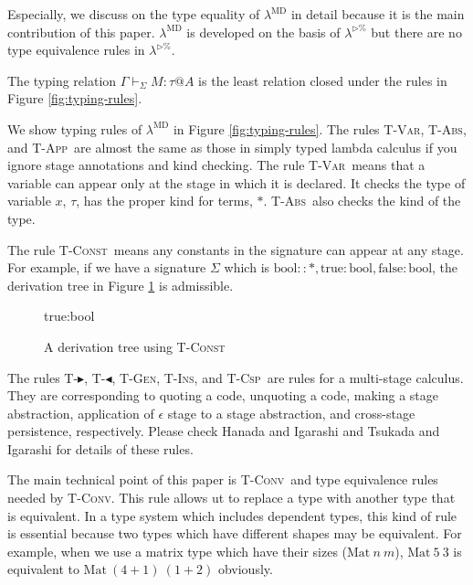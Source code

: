 \documentclass[runningheads]{llncs}
\newcommand{\LTP}{$\lambda^{\triangleright\%}$\xspace}
\newcommand{\LMD}{$\lambda^{\textrm{MD}}$\xspace}
\newcommand{\G}{\Gamma}
\newcommand{\V}{\vdash_\Sigma}
\newcommand{\TB}{\blacktriangleright}
\newcommand{\TBL}{\blacktriangleleft}
\newcommand{\TConst}{\textsc{T-Const}}
\newcommand{\TVar}{\textsc{T-Var}}
\newcommand{\TAbs}{\textsc{T-Abs}}
\newcommand{\TApp}{\textsc{T-App}}
\newcommand{\TConv}{\textsc{T-Conv}}
\newcommand{\TTB}{\textsc{T-$\TB$}}
\newcommand{\TTBL}{\textsc{T-$\TBL$}}
\newcommand{\TGen}{\textsc{T-Gen}}
\newcommand{\TIns}{\textsc{T-Ins}}
\newcommand{\TCsp}{\textsc{T-Csp}}
\newcommand{\ID}[1]{\infer[]{#1}{\vdots}}
\begin{document}
Especially, we discuss on the type equality of \LMD in detail
because it is the main contribution of this paper.
\LMD is developed on the basis of \LTP but there are no type equivalence rules in \LTP.

\begin{definition}[Typing]
	The typing relation $ \G \V M : \tau @ A $ is the least relation closed under the rules in Figure \ref{fig:typing-rules}.
\end{definition}


We show typing rules of \LMD in Figure \ref{fig:typing-rules}.
The rules \TVar , \TAbs, and \TApp\ are almost the same as those in simply typed lambda calculus 
if you ignore stage annotations and kind checking.
The rule \TVar\ means that a variable can appear only at the stage in which it is declared.
It checks the type of variable $x$, $\tau$, has the proper kind for terms, $*$.
\TAbs\ also checks the kind of the type.

The rule \TConst\ means any constants in the signature can appear at any stage.
For example, if we have a signature $\Sigma$ which is $\textrm{bool} :: *, \textrm{true}: \textrm{bool}, \textrm{false}: \textrm{bool}$,
the derivation tree in Figure \ref{fig:tconst-derivation-tree} is admissible.

\begin{figure}
	\begin{center}
		\begin{minipage}{0.50\hsize}
			\infer[\TConst]
			{\G \V \textrm{true}:\textrm{bool}@\alpha\beta}
			{\textrm{true}:\textrm{bool} \in \Sigma \andalso
				\ID{\G\V\textrm{bool}::*@\alpha\beta} \andalso
			}
			\caption{A derivation tree using \TConst}
			\label{fig:tconst-derivation-tree}
		\end{minipage}
	\end{center}
\end{figure}

The rules \TTB, \TTBL, \TGen, \TIns, and \TCsp\ are rules for a multi-stage calculus.
They are corresponding to quoting a code, unquoting a code, making a stage abstraction, 
application of $\epsilon$ stage to a stage abstraction, and cross-stage persistence, respectively.
Please check Hanada and Igarashi \cite{Hanada2014} and Tsukada and Igarashi \cite{Tsukada} for details of these rules.

The main technical point of this paper is \TConv\ and type equivalence rules needed by \TConv.
This rule allows ut to replace a type with another type that is equivalent.
In a type system which includes dependent types, this kind of rule is essential
because two types which have different shapes may be equivalent.
For example, when we use a matrix type which have their sizes ($\textrm{Mat}\ n\ m$),
$\textrm{Mat}\ 5\ 3$ is equivalent to $\textrm{Mat}\ (4+1)\ (1+2)$ obviously.
\end{document}

